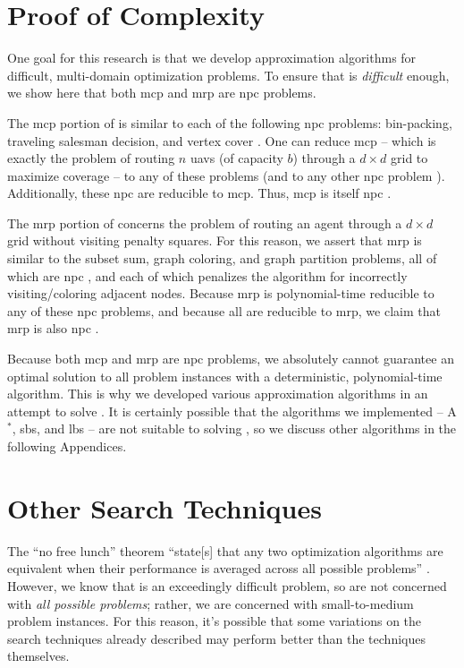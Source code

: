 \documentclass[../main.tex]{subfiles}
\begin{document}
\section{Proof of Complexity}\label{app:complexity}

One goal for this research is that we develop approximation algorithms for difficult, multi-domain optimization problems. To ensure that \probs is \textit{difficult} enough, we show here that both \ac{mcp} and \ac{mrp} are \ac{npc} problems.

The \acl{mcp} portion of \probs is similar to each of the following \ac{npc} problems: bin-packing, traveling salesman decision, and vertex cover \cite{wikipedia:npc-problems}. One can reduce \ac{mcp} -- which is exactly the problem of routing $n$ \acp{uav} (of capacity $b$) through a $d\times d$ grid to maximize coverage -- to any of these problems (and to any other \ac{npc} problem \cite{Kleinberg2005}). Additionally, these \ac{npc} are reducible to \ac{mcp}. Thus, \ac{mcp} is itself \ac{npc} \cite{Hochbaum1996, wikipedia:max-coverage}.

The \acl{mrp} portion of \probs concerns the problem of routing an agent through a $d\times d$ grid without visiting penalty squares. For this reason, we assert that \ac{mrp} is similar to the subset sum, graph coloring, and graph partition problems, all of which are \ac{npc} \cite{wikipedia:npc-problems}, and each of which penalizes the algorithm for incorrectly visiting/coloring adjacent nodes. Because \ac{mrp} is polynomial-time reducible to any of these \ac{npc} problems, and because all are reducible to \ac{mrp}, we claim that \ac{mrp} is also \ac{npc} \cite{Kleinberg2005}.

Because both \ac{mcp} and \ac{mrp} are \ac{npc} problems, we absolutely cannot guarantee an optimal solution to all problem instances with a deterministic, polynomial-time algorithm. This is why we developed various approximation algorithms in an attempt to solve \probs \cite{Williamson2011}. It is certainly possible that the algorithms we implemented -- A$^*$, \acl{sbs}, and \ac{lbs} -- are not suitable to solving \prob, so we discuss other algorithms in the following Appendices.

\section{Other Search Techniques}\label{app:other-search}

The ``no free lunch'' theorem ``state[s] that any two optimization algorithms are equivalent when their performance is averaged across all possible problems'' \cite{Wolpert1997}. However, we know that \probs is an exceedingly difficult problem, so are not concerned with \textit{all possible problems}; rather, we are concerned with small-to-medium problem instances. For this reason, it's possible that some variations on the search techniques already described may perform better than the techniques themselves.
\end{document}
